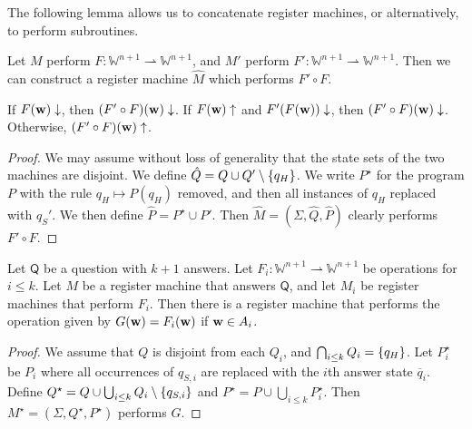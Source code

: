 The following lemma allows us to concatenate register machines, or alternatively, to perform subroutines.
\begin{lemma}[concatenation]
	Let \( M \) perform \( F \colon \mathbb W^{n+1} \rightharpoonup \mathbb W^{n+1} \), and \( M' \) perform \( F' \colon \mathbb W^{n+1} \rightharpoonup \mathbb W^{n+1} \).
	Then we can construct a register machine \( \hat M \) which performs \( F' \circ F \).
\end{lemma}
\begin{remark}
	If \( F(\vb w) \downarrow \), then \( (F' \circ F)(\vb w) \downarrow \).
	If \( F(\vb w) \uparrow \) and \( F'(F(\vb w)) \downarrow \), then \( (F' \circ F)(\vb w) \downarrow \).
	Otherwise, \( (F' \circ F)(\vb w) \uparrow \).
\end{remark}
\begin{proof}
	We may assume without loss of generality that the state sets of the two machines are disjoint.
	We define \( \hat Q = Q \cup Q' \setminus \qty{q_H} \).
	We write \( P^\star \) for the program \( P \) with the rule \( q_H \mapsto P(q_H) \) removed, and then all instances of \( q_H \) replaced with \( q_S' \).
	We then define \( \hat P = P^\star \cup P' \).
	Then \( \hat M = (\Sigma, \hat Q, \hat P) \) clearly performs \( F' \circ F \).
\end{proof}
\begin{lemma}
	Let \( \mathsf Q \) be a question with \( k + 1 \) answers.
	Let \( F_i \colon \mathbb W^{n+1} \rightharpoonup \mathbb W^{n+1} \) be operations for \( i \leq k \).
	Let \( M \) be a register machine that answers \( \mathsf Q \), and let \( M_i \) be register machines that perform \( F_i \).
	Then there is a register machine that performs the operation given by \( G(\vb w) = F_i(\vb w) \) if \( \vb w \in A_i \).
\end{lemma}
\begin{proof}
	We assume that \( Q \) is disjoint from each \( Q_i \), and \( \bigcap_{i \leq k} Q_i = \qty{q_H} \).
	Let \( P_i^\star \) be \( P_i \) where all occurrences of \( q_{S,i} \) are replaced with the \( i \)th answer state \( \overline q_i \).
	Define \( Q^\star = Q \cup \bigcup_{i \leq k} Q_i \setminus \qty{q_{S,i}} \) and \( P^\star = P \cup \bigcup_{i \leq k} P_i^\star \).
	Then \( M^\star = (\Sigma, Q^\star, P^\star) \) performs \( G \).
\end{proof}

